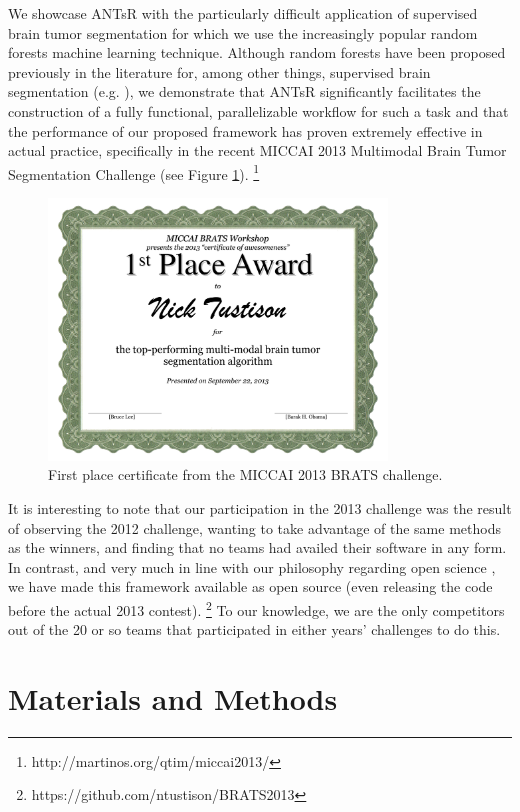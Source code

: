 \documentclass[final,5p,times,twocolumn]{elsarticle}
\begin{document}
We showcase ANTsR with
the particularly difficult application of supervised brain tumor
segmentation \citep{bauer2013} for which we use the increasingly popular 
random forests machine learning technique.  Although random forests have
been proposed previously in the literature for, among other things, 
supervised brain segmentation (e.g. \cite{geremia2011}), 
we demonstrate that ANTsR significantly facilitates the construction 
of a fully functional, parallelizable workflow for such a task and 
that the performance of our proposed framework has proven extremely effective in 
actual practice, specifically
 in the recent MICCAI 2013 Multimodal Brain Tumor Segmentation
Challenge (see Figure \ref{fig:award}).%
\footnote{
http://martinos.org/qtim/miccai2013/
}
\begin{figure}
  \centering
  \includegraphics[width=90mm]{Figures/award.pdf}
  \caption{First place certificate from the MICCAI 2013 BRATS challenge.}
  \label{fig:award}
\end{figure}

It is interesting to note that our participation in the 2013 challenge
was the result of observing the 2012
challenge, wanting to take advantage of the same methods as the winners,
and finding that no teams had availed their software in any form.  In contrast, 
and very much in line with our philosophy 
regarding open science \citep{tustison2013,ince2012}, we have made this framework available as open 
source (even releasing the code before the actual 2013 contest).%
\footnote{
https://github.com/ntustison/BRATS2013
}
To our knowledge, we are the only competitors out of the 20 or so teams 
that participated in either years' challenges to do this.

\section{Materials and Methods}
\end{document}
